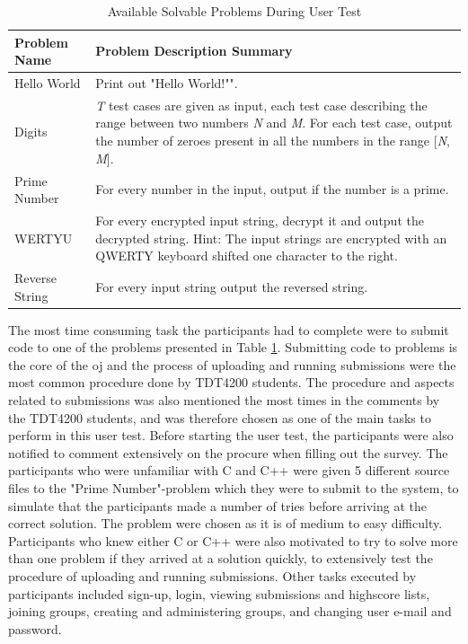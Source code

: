 \begin{table}
    \centering
    \begin{tabular}{ | l | p{6cm} |}
    \hline
    \textbf{Problem Name} & \textbf{Problem Description Summary} \\ \hline
    Hello World & Print out "Hello World!"". \\ \hline
    Digits & \textit{T} test cases are given as input, each test case describing the range between two numbers \textit{N} and \textit{M}. For each test case, output the number of zeroes present in all the numbers in the range [\textit{N}, \textit{M}]. \\ \hline
    Prime Number & For every number in the input, output if the number is a prime. \\ \hline
    WERTYU & For every encrypted input string, decrypt it and output the decrypted string. Hint: The input strings are encrypted with an QWERTY keyboard shifted one character to the right. \\ \hline
    Reverse String & For every input string output the reversed string. \\
    \hline
    \end{tabular}
    \caption{Available Solvable Problems During User Test}
    \label{tab:avail-prob}
\end{table}

The most time consuming task the participants had to complete were to submit code to one of the problems presented in Table \ref{tab:avail-prob}. Submitting code to problems is the core of the \gls{oj} and the process of uploading and running submissions were the most common procedure done by TDT4200 students. The procedure and aspects related to submissions was also mentioned the most times in the comments by the TDT4200 students, and was therefore chosen as one of the main tasks to perform in this user test. Before starting the user test, the participants were also notified to comment extensively on the procure when filling out the survey. The participants who were unfamiliar with C and C++ were given 5 different source files to the "Prime Number"-problem which they were to submit to the system, to simulate that the participants made a number of tries before arriving at the correct solution. The problem were chosen as it is of medium to easy difficulty. Participants who knew either C or C++ were also motivated to try to solve more than one problem if they arrived at a solution quickly, to extensively test the procedure of uploading and running submissions. Other tasks executed by participants included sign-up, login, viewing submissions and highscore lists, joining groups, creating and administering groups, and changing user e-mail and password. \\

